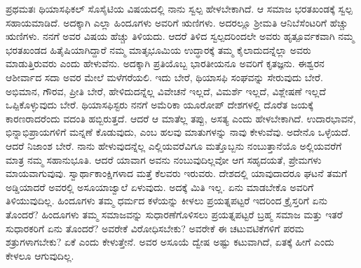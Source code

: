 ಪ್ರಥಮತಃ ಥಿಯಾಸಫಿಕಲ್​ ಸೊಸೈಟಿಯ ವಿಷಯದಲ್ಲಿ ನಾನು ಸ್ವಲ್ಪ ಹೇಳಬೇಕಾಗಿದೆ. ಆ ಸಮಾಜ ಭರತಖಂಡಕ್ಕೆ ಸ್ವಲ್ಪ ಸಹಾಯಮಾಡಿದೆ. ಅದಕ್ಕಾಗಿ ಎಲ್ಲಾ ಹಿಂದೂಗಳು ಅವರಿಗೆ ಋಣಿಗಳು. ಅದರಲ್ಲೂ ಶ‍್ರೀಮತಿ ಆನಿಬೆಸೆಂಟರಿಗೆ ಹೆಚ್ಚು ಋಣಿಗಳು. ನನಗೆ ಅವರ ವಿಷಯ ಹೆಚ್ಚು ತಿಳಿಯದು. ಆದರೆ ತಿಳಿದ ಸ್ವಲ್ಪದರಿಂದಲೇ ಅವರು ಹೃತ್ಪೂರ್ವಕವಾಗಿ ನಮ್ಮ ಭರತಖಂಡದ ಹಿತೈಷಿಯಾಗಿದ್ದಾರೆ ನಮ್ಮ ಮಾತೃಭೂಮಿಯ ಉದ್ಧಾರಕ್ಕೆ ತಮ್ಮ ಕೈಲಾದುದನ್ನೆಲ್ಲಾ ಅವರು ಮಾಡುತ್ತಿರುವರು ಎಂದು ಹೇಳುವೆನು. ಅದಕ್ಕಾಗಿ ಪ್ರತಿಯೊಬ್ಬ ಭಾರತೀಯನೂ ಅವರಿಗೆ ಕೃತಜ್ಞನು. ಈಶ್ವರನ ಆಶೀರ್ವಾದ ಸದಾ ಅವರ ಮೇಲೆ ಮಳೆಗರೆಯಲಿ. ಇದು ಬೇರೆ, ಥಿಯಾಸಫಿ ಸಂಘವನ್ನು ಸೇರುವುದು ಬೇರೆ. ಅಭಿಮಾನ, ಗೌರವ, ಪ್ರೀತಿ ಬೇರೆ, ಹೇಳಿದುದನ್ನೆಲ್ಲ ವಿವೇಚನೆ ಇಲ್ಲದೆ, ವಿಮರ್ಶೆ ಇಲ್ಲದೆ, ವಿಶ್ಲೇಷಣೆ ಇಲ್ಲದೆ ಒಪ್ಪಿಕೊಳ್ಳುವುದು ಬೇರೆ. ಥಿಯಾಸಫಿಸ್ಟರು ನನಗೆ ಅಮೆರಿಕಾ ಯೂರೋಪ್​ ದೇಶಗಳಲ್ಲಿ ದೊರೆತ ಜಯಕ್ಕೆ ಕಾರಣರಾದರೆಂದು ವದಂತಿ ಹಬ್ಬಿರುತ್ತದೆ. ಆದರೆ ಆ ಮಾತೆಲ್ಲ ತಪ್ಪು, ಅಸತ್ಯ ಎಂದು ಹೇಳಬೇಕಾಗಿದೆ. ಉದಾರಭಾವನೆ, ಭಿನ್ನಾಭಿಪ್ರಾಯಗಳಿಗೆ ಮನ್ನಣೆ ಕೊಡುವುದು, ಎಂಬ ಹಲವು ಮಾತುಗಳನ್ನು ನಾವು ಕೇಳುವೆವು. ಅದೇನೊ ಒಳ್ಳೆಯದೆ. ಆದರೆ ನಿಜಾಂಶ ಬೇರೆ. ನಾನು ಹೇಳುವುದನ್ನೆಲ್ಲ ಎಲ್ಲಿಯವರೆವಿಗೂ ಮತ್ತೊಬ್ಬನು ನಂಬುತ್ತಾನೆಯೊ ಅಲ್ಲಿಯವರೆಗೆ ಮಾತ್ರ ನಮ್ಮ ಸಹಾನುಭೂತಿ. ಆದರೆ ಯಾವಾಗ ಅವನು ನಂಬುವುದಿಲ್ಲವೋ ಆಗ ಸಹೃದಯತೆ, ಪ್ರೇಮಗಳು ಮಾಯವಾಗುವುವು. ಸ್ವಾರ್ಥಾಕಾಂಕ್ಷಿಗಳಾದ ಮತ್ತೆ ಕೆಲವರು ಇರುವರು. ದೇಶದಲ್ಲಿ ಯಾವುದಾದರೂ ಘಟನೆ ತಮಗೆ ಅಡ್ಡಿಯಾದರೆ ಅವರಲ್ಲಿ ಅಸೂಯಾಜ್ವಾಲೆ ಏಳುವುದು. ಅದಕ್ಕೆ ಮಿತಿ ಇಲ್ಲ. ಏನು ಮಾಡಬೇಕೊ ಅವರಿಗೆ ತಿಳಿಯುವುದಿಲ್ಲ. ಹಿಂದೂಗಳು ತಮ್ಮ ಧರ್ಮದ ಕಳೆಯನ್ನು ಕೀಳಲು ಪ್ರಯತ್ನಪಟ್ಟರೆ ಇದರಿಂದ ಕ್ರೈಸ್ತರಿಗೆ ಏನು ತೊಂದರೆ? ಹಿಂದೂಗಳು ತಮ್ಮ ಸಮಾಜವನ್ನು ಸುಧಾರಣೆಗೊಳಿಸಲು ಪ್ರಯತ್ನಪಟ್ಟರೆ ಬ್ರಹ್ಮ ಸಮಾಜ ಮತ್ತು ಇತರೆ ಸುಧಾರಕರಿಗೆ ಏನು ತೊಂದರೆ? ಅವರೇಕೆ ವಿರೋಧಿಸಬೇಕು? ಅವರೇಕೆ ಈ ಚಟುವಟಿಕೆಗಳಿಗೆ ಪರಮ ಶತ್ರುಗಳಾಗಬೇಕು? ಏಕೆ ಎಂದು ಕೇಳುತ್ತೇನೆ. ಅವರ ಅಸೂಯೆ ದ್ವೇಷ ಅಷ್ಟು ಕಟುವಾಗಿದೆ, ಏತಕ್ಕೆ ಹೀಗೆ ಎಂದು ಕೇಳಲೂ ಆಗುವುದಿಲ್ಲ.

